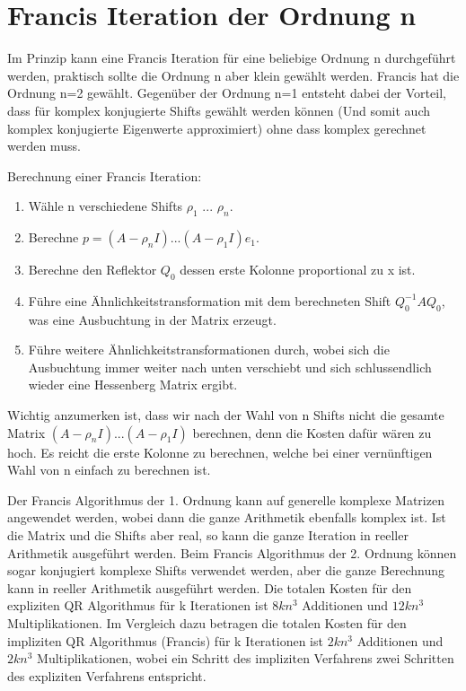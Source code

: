 \section{Francis Iteration der Ordnung n}

Im Prinzip kann eine Francis Iteration für eine beliebige Ordnung n durchgeführt werden, praktisch sollte die Ordnung n aber klein gewählt werden.
Francis hat die Ordnung n=2 gewählt.
Gegenüber der Ordnung n=1 entsteht dabei der Vorteil, dass für komplex konjugierte Shifts gewählt werden können (Und somit auch komplex konjugierte Eigenwerte approximiert) ohne dass komplex gerechnet werden muss.

Berechnung einer Francis Iteration:
\begin{enumerate}
	\item Wähle n verschiedene Shifts $\rho_{1}$ ... $\rho_{n}$.
	\item Berechne $p= (A - \rho_{n}I) ... (A - \rho_{1}I)e_{1}$.
	\item Berechne den Reflektor $Q_{0}$ dessen erste Kolonne proportional zu x ist.
	\item Führe eine Ähnlichkeitstransformation mit dem berechneten Shift $Q_{0}^{-1}AQ_{0}$, was eine \glqq Ausbuchtung \grqq in der Matrix erzeugt.
	\item Führe weitere Ähnlichkeitstransformationen durch, wobei sich die Ausbuchtung immer weiter nach unten verschiebt und sich schlussendlich wieder eine Hessenberg Matrix ergibt.
\end{enumerate}

Wichtig anzumerken ist, dass wir nach der Wahl von n Shifts nicht die gesamte Matrix $(A - \rho_{n}I) ... (A - \rho_{1}I)$ berechnen, denn die Kosten dafür wären zu hoch. Es reicht die erste Kolonne zu berechnen, welche bei einer vernünftigen Wahl von n einfach zu berechnen ist.

Der Francis Algorithmus der 1. Ordnung kann auf generelle komplexe Matrizen angewendet werden, wobei dann die ganze Arithmetik ebenfalls komplex ist.
Ist die Matrix und die Shifts aber real, so kann die ganze Iteration in reeller Arithmetik ausgeführt werden.
Beim Francis Algorithmus der 2. Ordnung können sogar konjugiert komplexe Shifts verwendet werden, aber die ganze Berechnung kann in reeller Arithmetik ausgeführt werden.
Die totalen Kosten für den expliziten QR Algorithmus für k Iterationen ist $8kn^{3}$ Additionen und $12kn^{3}$ Multiplikationen.
Im Vergleich dazu betragen die totalen Kosten für den impliziten QR Algorithmus (Francis) für k Iterationen ist $2kn^{3}$ Additionen und $2kn^{3}$ Multiplikationen, wobei ein Schritt des impliziten Verfahrens zwei Schritten des expliziten Verfahrens entspricht. \cite{francis:EthSeminar}
